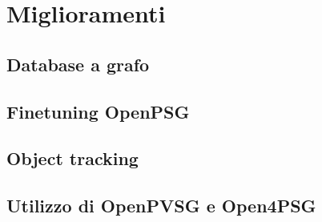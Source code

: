\section{Miglioramenti}
\subsection{Database a grafo}
\subsection{Finetuning OpenPSG}
\subsection{Object tracking}
\subsection{Utilizzo di OpenPVSG e Open4PSG}